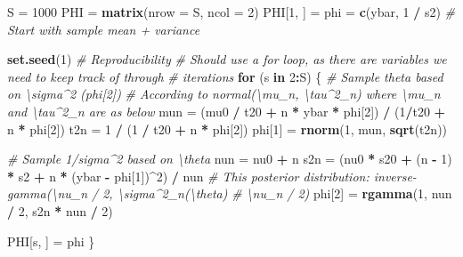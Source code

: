 \documentclass[]{article}
\newenvironment{Shaded}{\begin{snugshade}}{\end{snugshade}}
\newcommand{\CommentTok}[1]{\textcolor[rgb]{0.56,0.35,0.01}{\textit{#1}}}
\newcommand{\ControlFlowTok}[1]{\textcolor[rgb]{0.13,0.29,0.53}{\textbf{#1}}}
\newcommand{\DataTypeTok}[1]{\textcolor[rgb]{0.13,0.29,0.53}{#1}}
\newcommand{\DecValTok}[1]{\textcolor[rgb]{0.00,0.00,0.81}{#1}}
\newcommand{\KeywordTok}[1]{\textcolor[rgb]{0.13,0.29,0.53}{\textbf{#1}}}
\newcommand{\NormalTok}[1]{#1}
\newcommand{\OperatorTok}[1]{\textcolor[rgb]{0.81,0.36,0.00}{\textbf{#1}}}
\newcommand{\StringTok}[1]{\textcolor[rgb]{0.31,0.60,0.02}{#1}}
\begin{document}
\begin{Shaded}
\begin{Highlighting}[]
\NormalTok{S =}\StringTok{ }\DecValTok{1000}
\NormalTok{PHI =}\StringTok{ }\KeywordTok{matrix}\NormalTok{(}\DataTypeTok{nrow =}\NormalTok{ S, }\DataTypeTok{ncol =} \DecValTok{2}\NormalTok{)}
\NormalTok{PHI[}\DecValTok{1}\NormalTok{, ] =}\StringTok{ }\NormalTok{phi =}\StringTok{ }\KeywordTok{c}\NormalTok{(ybar, }\DecValTok{1} \OperatorTok{/}\StringTok{ }\NormalTok{s2) }\CommentTok{# Start with sample mean + variance}

\KeywordTok{set.seed}\NormalTok{(}\DecValTok{1}\NormalTok{) }\CommentTok{# Reproducibility}
\CommentTok{# Should use a for loop, as there are variables we need to keep track of through}
\CommentTok{# iterations}
\ControlFlowTok{for}\NormalTok{ (s }\ControlFlowTok{in} \DecValTok{2}\OperatorTok{:}\NormalTok{S) \{}
  \CommentTok{# Sample theta based on \textbackslash{}sigma^2 (phi[2])}
  \CommentTok{# According to normal(\textbackslash{}mu_n, \textbackslash{}tau^2_n) where \textbackslash{}mu_n and \textbackslash{}tau^2_n are as below}
\NormalTok{  mun =}\StringTok{ }\NormalTok{(mu0 }\OperatorTok{/}\StringTok{ }\NormalTok{t20 }\OperatorTok{+}\StringTok{ }\NormalTok{n }\OperatorTok{*}\StringTok{ }\NormalTok{ybar }\OperatorTok{*}\StringTok{ }\NormalTok{phi[}\DecValTok{2}\NormalTok{]) }\OperatorTok{/}\StringTok{ }\NormalTok{(}\DecValTok{1}\OperatorTok{/}\NormalTok{t20 }\OperatorTok{+}\StringTok{ }\NormalTok{n }\OperatorTok{*}\StringTok{ }\NormalTok{phi[}\DecValTok{2}\NormalTok{])}
\NormalTok{  t2n =}\StringTok{ }\DecValTok{1} \OperatorTok{/}\StringTok{ }\NormalTok{(}\DecValTok{1} \OperatorTok{/}\StringTok{ }\NormalTok{t20 }\OperatorTok{+}\StringTok{ }\NormalTok{n }\OperatorTok{*}\StringTok{ }\NormalTok{phi[}\DecValTok{2}\NormalTok{])}
\NormalTok{  phi[}\DecValTok{1}\NormalTok{] =}\StringTok{ }\KeywordTok{rnorm}\NormalTok{(}\DecValTok{1}\NormalTok{, mun, }\KeywordTok{sqrt}\NormalTok{(t2n))}

  \CommentTok{# Sample 1/sigma^2 based on \textbackslash{}theta}
\NormalTok{  nun =}\StringTok{ }\NormalTok{nu0 }\OperatorTok{+}\StringTok{ }\NormalTok{n}
\NormalTok{  s2n =}\StringTok{ }\NormalTok{(nu0 }\OperatorTok{*}\StringTok{ }\NormalTok{s20 }\OperatorTok{+}\StringTok{ }\NormalTok{(n }\OperatorTok{-}\StringTok{ }\DecValTok{1}\NormalTok{) }\OperatorTok{*}\StringTok{ }\NormalTok{s2 }\OperatorTok{+}\StringTok{ }\NormalTok{n }\OperatorTok{*}\StringTok{ }\NormalTok{(ybar }\OperatorTok{-}\StringTok{ }\NormalTok{phi[}\DecValTok{1}\NormalTok{])}\OperatorTok{^}\DecValTok{2}\NormalTok{) }\OperatorTok{/}\StringTok{ }\NormalTok{nun}
  \CommentTok{# This posterior distribution: inverse-gamma(\textbackslash{}nu_n / 2, \textbackslash{}sigma^2_n(\textbackslash{}theta)}
  \CommentTok{# \textbackslash{}nu_n / 2)}
\NormalTok{  phi[}\DecValTok{2}\NormalTok{] =}\StringTok{ }\KeywordTok{rgamma}\NormalTok{(}\DecValTok{1}\NormalTok{, nun }\OperatorTok{/}\StringTok{ }\DecValTok{2}\NormalTok{, s2n }\OperatorTok{*}\StringTok{ }\NormalTok{nun }\OperatorTok{/}\StringTok{ }\DecValTok{2}\NormalTok{)}

\NormalTok{  PHI[s, ] =}\StringTok{ }\NormalTok{phi}
\NormalTok{\}}
\end{Highlighting}
\end{Shaded}
\end{document}
